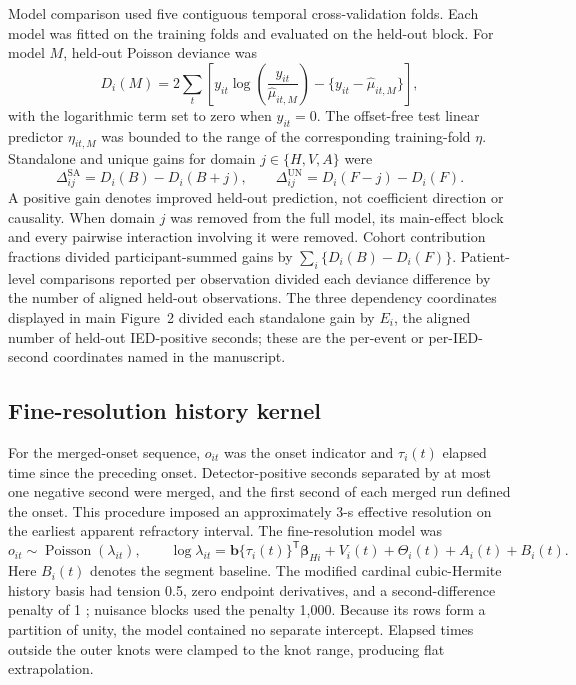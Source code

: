 \documentclass[11pt]{article}
\begin{document}
Model comparison used five contiguous temporal cross-validation folds. Each model was fitted on the training folds and evaluated on the held-out block. For model $M$, held-out Poisson deviance was
\begin{equation}
D_i(M)=2\sum_t\left[y_{it}\log\!\left(\frac{y_{it}}{\widehat\mu_{it,M}}\right)-\{y_{it}-\widehat\mu_{it,M}\}\right],
\label{eq:deviance}
\end{equation}
with the logarithmic term set to zero when $y_{it}=0$. The offset-free test linear predictor $\eta_{it,M}$ was bounded to the range of the corresponding training-fold $\eta$. Standalone and unique gains for domain $j\in\{H,V,A\}$ were
\begin{equation}
\Delta^{\mathrm{SA}}_{ij}=D_i(B)-D_i(B+j),\qquad
\Delta^{\mathrm{UN}}_{ij}=D_i(F-j)-D_i(F).
\label{eq:gains}
\end{equation}
A positive gain denotes improved held-out prediction, not coefficient direction or causality. When domain $j$ was removed from the full model, its main-effect block and every pairwise interaction involving it were removed. Cohort contribution fractions divided participant-summed gains by $\sum_i\{D_i(B)-D_i(F)\}$. Patient-level comparisons reported per observation divided each deviance difference by the number of aligned held-out observations. The three dependency coordinates displayed in main Figure~2 divided each standalone gain by $E_i$, the aligned number of held-out IED-positive seconds; these are the per-event or per-IED-second coordinates named in the manuscript.

\subsection*{Fine-resolution history kernel}

For the merged-onset sequence, $o_{it}$ was the onset indicator and $\tau_i(t)$ elapsed time since the preceding onset. Detector-positive seconds separated by at most one negative second were merged, and the first second of each merged run defined the onset. This procedure imposed an approximately 3-s effective resolution on the earliest apparent refractory interval. The fine-resolution model was
\begin{equation}
o_{it}\sim\operatorname{Poisson}(\lambda_{it}),\qquad
\log\lambda_{it}=\bm b\{\tau_i(t)\}^{\mathsf T}\bm\beta_{Hi}+V_i(t)+\Theta_i(t)+A_i(t)+B_i(t).
\label{eq:kernel}
\end{equation}
Here $B_i(t)$ denotes the segment baseline. The modified cardinal cubic-Hermite history basis had tension 0.5, zero endpoint derivatives, and a second-difference penalty of 1 \cite{Sarmashghi2021}; nuisance blocks used the penalty 1,000. Because its rows form a partition of unity, the model contained no separate intercept. Elapsed times outside the outer knots were clamped to the knot range, producing flat extrapolation.
\end{document}
